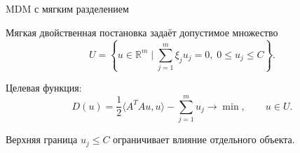 \SPBGContentSlide
  {MDM с мягким разделением}
  {%
    \FormulaBody
    Мягкая двойственная постановка задаёт допустимое множество
    \[
      U=\left\{
        u\in\mathbb{R}^m\mid
        \sum_{j=1}^{m}\xi_j u_j=0,\;
        0\leq u_j\leq C
      \right\}.
    \]

    Целевая функция:
    \[
      D(u)=
      \frac12\langle A^TAu,u\rangle-\sum_{j=1}^{m}u_j
      \rightarrow \min,\qquad u\in U.
    \]

    Верхняя граница $u_j\leq C$ ограничивает влияние отдельного объекта.
  }
